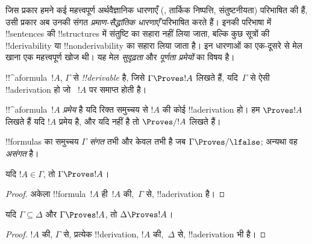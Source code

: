 \documentclass[../../../include/open-logic-section]{subfiles}
\begin{document}
      {}
      {}


\begin{explain}
जिस प्रकार हमने कई महत्त्वपूर्ण अर्थवैज्ञानिक धारणाएँ
(, तार्किक निष्पत्ति, संतुष्टनीयता) परिभाषित
की हैं, उसी प्रकार अब उनकी संगत \emph{प्रमाण-सैद्धांतिक धारणाएँ} परिभाषित
करते हैं। इनकी परिभाषा में !!{sentence}s की !!{structure}s में संतुष्टि का
सहारा नहीं लिया जाता, बल्कि कुछ सूत्रों की !!{derivability} या
!!{nonderivability} का सहारा लिया जाता है। इन धारणाओं का एक-दूसरे से मेल
खाना एक महत्त्वपूर्ण खोज थी। यह मेल \emph{सुदृढ़ता} और \emph{पूर्णता
प्रमेयों} का विषय है।
\end{explain}

\begin{defn}[!!^{derivability}]
!!^a{formula}~$!A$, $\Gamma$ से \emph{!!{derivable}} है, जिसे
$\Gamma \Proves !A$ लिखते हैं, यदि~$\Gamma$ से ऐसी !!a{derivation} हो जो
~$!A$ पर समाप्त होती है।
\end{defn}

\begin{defn}[प्रमेय]
!!^a{formula}~$!A$ \emph{प्रमेय} है यदि रिक्त समुच्चय से $!A$ की कोई
!!a{derivation} हो। हम $\Proves !A$ लिखते हैं यदि $!A$ प्रमेय है, और यदि
नहीं है तो
$\Proves/ !A$ लिखते हैं।
\end{defn}

\begin{defn}[संगतता]
!!{formula}s का समुच्चय $\Gamma$ \emph{संगत} तभी और केवल तभी है जब
$\Gamma\Proves/ \lfalse$; अन्यथा वह \emph{असंगत} है।
\end{defn}

\begin{prop}[स्वतुल्यता]
यदि $!A \in \Gamma$, तो $\Gamma \Proves !A$।
\end{prop}

\begin{proof}
  अकेला !!{formula}~$!A$ ही~$!A$ की,~$\Gamma$ से, !!a{derivation} है।
\end{proof}

\begin{prop}[एकदिष्टता]
यदि $\Gamma \subseteq \Delta$ और $\Gamma \Proves !A$, तो $\Delta
\Proves !A$।
\end{prop}

\begin{proof}
$!A$ की, $\Gamma$ से, प्रत्येक !!{derivation}, $!A$ की,~$\Delta$ से,
!!a{derivation} भी है।
\end{proof}
\end{document}
